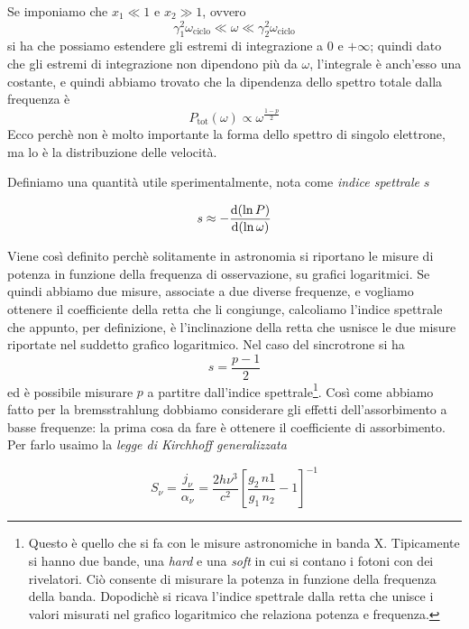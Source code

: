 Se imponiamo che $x_1\ll 1$ e $x_2\gg 1$, ovvero 
\begin{equation}
\gamma_1^2 \omega_\mathrm{ciclo} \ll \omega \ll \gamma_2^2 \omega_\mathrm{ciclo}
\end{equation}
si ha che possiamo estendere gli estremi di integrazione a $0$ e $+\infty$; quindi dato che gli estremi di integrazione non dipendono più da $\omega$, l'integrale è anch'esso una costante, e quindi abbiamo trovato che la dipendenza dello spettro totale dalla frequenza è 
\begin{equation}
P_\mathrm{tot}(\omega) \propto \omega^\frac{1-p}{2} \label{eq:Sincrotrone4}
\end{equation}
Ecco perchè non è molto importante la forma dello spettro di singolo elettrone, ma lo è la distribuzione delle velocità.

Definiamo una quantità utile sperimentalmente, nota come \textit{indice spettrale} $s$
\begin{EQ}
\begin{equation}
s \approx -\dfrac{\mathrm{d} {(\ln P)}}{\mathrm{d} {(\ln\omega)}}
\end{equation}
\end{EQ}
Viene così definito perchè solitamente in astronomia si riportano le misure di potenza in funzione della frequenza di osservazione, su grafici logaritmici. Se quindi abbiamo due misure, associate a due diverse frequenze, e vogliamo ottenere il coefficiente della retta che li congiunge, calcoliamo l'indice spettrale che appunto, per definizione, è l'inclinazione della retta che usnisce le due misure riportate nel suddetto grafico logaritmico. Nel caso del sincrotrone si ha
\begin{equation}
s=\dfrac{p-1}{2}
\end{equation}
ed è possibile misurare $p$ a partitre dall'indice spettrale\footnote{Questo è quello che si fa con le misure astronomiche in banda X. Tipicamente si hanno due bande, una \textit{hard} e una \textit{soft} in cui si contano i fotoni con dei rivelatori. Ciò consente di misurare la potenza in funzione della frequenza della banda. Dopodichè si ricava l'indice spettrale dalla retta che unisce i valori misurati nel grafico logaritmico che relaziona potenza e frequenza.}.
Così come abbiamo fatto per la bremsstrahlung dobbiamo considerare gli effetti dell'assorbimento a basse frequenze: la prima cosa da fare è ottenere il coefficiente di assorbimento. Per farlo usaimo la \textit{legge di Kirchhoff generalizzata}
\begin{EQ}
\begin{equation}
S_\nu = \dfrac{j_\nu}{\alpha_\nu} = \dfrac{2h\nu^3}{c^2}\left[ \dfrac{g_2\,n1}{g_1\,n_2} -1 \right]^{-1} \label{eq:Sincrotrone3}
\end{equation}
\end{EQ}
